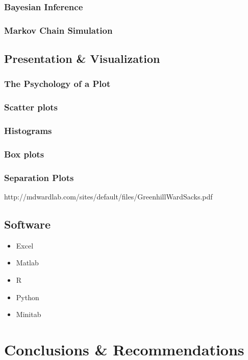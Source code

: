 \documentclass[11pt,a4paper,article]{memoir} %
\begin{document}
\subsection{Bayesian Inference}
\subsection{Markov Chain Simulation}

\section{Presentation \& Visualization}
\subsection{The Psychology of a Plot}
\subsection{Scatter plots}
\subsection{Histograms}
\subsection{Box plots}
\subsection{Separation Plots}
http://mdwardlab.com/sites/default/files/GreenhillWardSacks.pdf

\section{Software}
\begin{itemize}
\item Excel
\item Matlab
\item R
\item Python
\item Minitab
\end{itemize}

\newpage


\chapter{Conclusions \& Recommendations}
\end{document}
